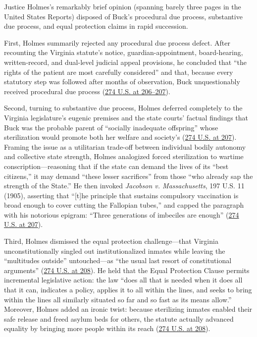 \documentclass[12pt]{article}
\begin{document}
Justice Holmes's remarkably brief opinion (spanning barely three pages in the United States Reports) disposed of Buck's procedural due process, substantive due process, and equal protection claims in rapid succession.

First, Holmes summarily rejected any procedural due process defect. After recounting the Virginia statute's notice, guardian-appointment, board-hearing, written-record, and dual-level judicial appeal provisions, he concluded that ``the rights of the patient are most carefully considered'' and that, because every statutory step was followed after months of observation, Buck unquestionably received procedural due process (\href{https://supreme.justia.com/cases/federal/us/274/200/}{274 U.S. at 206--207}).

Second, turning to substantive due process, Holmes deferred completely to the Virginia legislature's eugenic premises and the state courts' factual findings that Buck was the probable parent of ``socially inadequate offspring'' whose sterilization would promote both her welfare and society's (\href{https://supreme.justia.com/cases/federal/us/274/200/}{274 U.S. at 207}). Framing the issue as a utilitarian trade-off between individual bodily autonomy and collective state strength, Holmes analogized forced sterilization to wartime conscription---reasoning that if the state can demand the lives of its ``best citizens,'' it may demand ``these lesser sacrifices'' from those ``who already sap the strength of the State.'' He then invoked \textit{Jacobson v. Massachusetts}, 197 U.S. 11 (1905), asserting that ``[t]he principle that sustains compulsory vaccination is broad enough to cover cutting the Fallopian tubes,'' and capped the paragraph with his notorious epigram: ``Three generations of imbeciles are enough'' (\href{https://supreme.justia.com/cases/federal/us/274/200/}{274 U.S. at 207}).

Third, Holmes dismissed the equal protection challenge---that Virginia unconstitutionally singled out institutionalized inmates while leaving the ``multitudes outside'' untouched---as ``the usual last resort of constitutional arguments'' (\href{https://supreme.justia.com/cases/federal/us/274/200/}{274 U.S. at 208}). He held that the Equal Protection Clause permits incremental legislative action: the law ``does all that is needed when it does all that it can, indicates a policy, applies it to all within the lines, and seeks to bring within the lines all similarly situated so far and so fast as its means allow.'' Moreover, Holmes added an ironic twist: because sterilizing inmates enabled their safe release and freed asylum beds for others, the statute actually advanced equality by bringing more people within its reach (\href{https://supreme.justia.com/cases/federal/us/274/200/}{274 U.S. at 208}).
\end{document}
